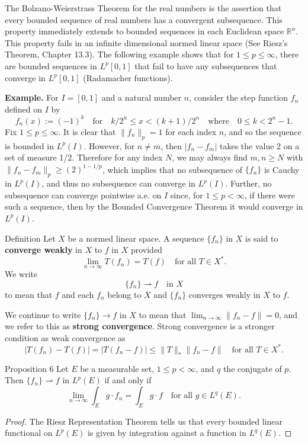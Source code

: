 The Bolzano-Weierstrass Theorem for the real numbers is the assertion that every bounded sequence of real numbers has a convergent subsequence.
This property immediately extends to bounded sequences in each Euclidean space $\mathbb{R}^n$.
This property fails in an infinite dimensional normed linear space (See Riesz's Theorem, Chapter 13.3).
The following example shows that for $1\le p\le\infty$, there are bounded sequences in $L^p[0,1]$ that fail to have any subsequences that converge in $L^p[0,1]$ (Radamacher functions).

\textbf{Example.}
For $I=[0,1]$ and a natural number $n$, consider the step function $f_n$ defined on $I$ by
\[
    f_n(x):=(-1)^k\quad\text{for}\quad k/2^n\le x<(k+1)/2^n\quad\text{where}\quad0\le k<2^n-1.
\]
Fix $1\le p\le\infty$.
It is clear that $\|f_n\|_p=1$ for each index $n$, and so the sequence is bounded in $L^p(I)$.
However, for $n\neq m$, then $|f_n-f_m|$ takes the value 2 on a set of measure 1/2.
Therefore for any index $N$, we may always find $m,n\ge N$ with $\|f_n-f_m\|_p\ge(2)^{1-1/p}$, which implies that no subsequence of $\{f_n\}$ is Cauchy in $L^p(I)$, and thus no subsequence can converge in $L^p(I)$.
Further, no subsequence can converge pointwise a.e. on $I$ since, for $1\le p<\infty$, if there were such a sequence, then by the Bounded Convergence Theorem it would converge in $L^p(I)$.

\begin{namedthm*}{Definition}
    Let $X$ be a normed linear space.
    A sequence $\{f_n\}$ in $X$ is said to \textbf{converge weakly} in $X$ to $f$ in $X$ provided
    \[
        \lim_{n\to\infty}T(f_n)=T(f)\quad\text{for all }T\in X^*.
    \]
    We write 
    \[
        \{f_n\}\rightharpoonup f\quad\text{in }X
    \]
    to mean that $f$ and each $f_n$ belong to $X$ and $\{f_n\}$ converges weakly in $X$ to $f$.
\end{namedthm*}
We continue to write $\{f_n\}\to f$ in $X$ to mean that $\lim_{n\to\infty}\|f_n-f\|=0$, and we refer to this as \textbf{strong convergence}.
Strong convergence is a stronger condition as weak convergence as
\[
    |T(f_n)-T(f)|=|T(f_n-f)|\le\|T\|_*\|f_n-f\|\quad\text{for all }T\in X^*.
\]
\begin{namedthm*}{Proposition 6}
    Let $E$ be a measurable set, $1\le p<\infty$, and $q$ the conjugate of $p$.
    Then $\{f_n\}\rightharpoonup f$ in $L^p(E)$ if and only if 
    \[
        \lim_{n\to\infty}\int_Eg\cdot f_n=\int_Eg\cdot f\quad\text{for all }g\in L^q(E).
    \]
\end{namedthm*}
\begin{proof}
    The Riesz Representation Theorem tells us that every bounded linear functional on $L^p(E)$ is given by integration against a function in $L^q(E)$.
\end{proof}

